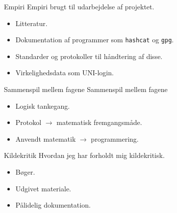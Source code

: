 \documentclass[10pt, aspectratio=169, usepdftitle=false]{beamer}
\begin{document}
\begin{frame}{Empiri}
    \alert{Empiri brugt til udarbejdelse af projektet.}
    \begin{itemize}
        \item Litteratur.
        \item Dokumentation af programmer som \texttt{hashcat} og \texttt{gpg}.
        \item Standarder og protokoller til håndtering af disse.
        \item Virkelighedsdata som UNI-login.
    \end{itemize}
\end{frame}

\begin{frame}{Sammenspil mellem fagene}
    \alert{Sammenspil mellem fagene}
    \begin{itemize}
        \item Logisk tankegang.
        \item Protokol \(\rightarrow\) matematisk fremgangsmåde.
        \item Anvendt matematik \(\rightarrow\) programmering.
    \end{itemize}
\end{frame}

\begin{frame}{Kildekritik}
    \alert{Hvordan jeg har forholdt mig kildekritisk.}
    \begin{itemize}
        \item Bøger.
        \item Udgivet materiale.
        \item Pålidelig dokumentation.
    \end{itemize}
\end{frame}
\end{document}
